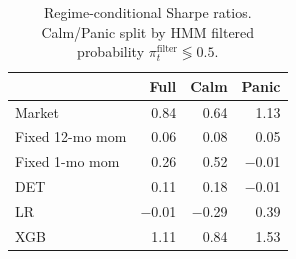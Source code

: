 \begin{table}[htbp]
\centering
\begin{tabular}{l r r r}
\toprule
 & Full & Calm & Panic \\
\midrule
Market & 0.84 & 0.64 & 1.13 \\
\midrule
Fixed 12-mo mom & 0.06 & 0.08 & 0.05 \\
Fixed 1-mo mom & 0.26 & 0.52 & $-$0.01 \\
DET & 0.11 & 0.18 & $-$0.01 \\
LR & $-$0.01 & $-$0.29 & 0.39 \\
XGB & 1.11 & 0.84 & 1.53 \\
\bottomrule
\end{tabular}
\caption{Regime-conditional Sharpe ratios. Calm/Panic split by HMM filtered probability $\pi_t^{\text{filter}} \lessgtr 0.5$.}
\label{tab:regime_sharpe}
\end{table}
